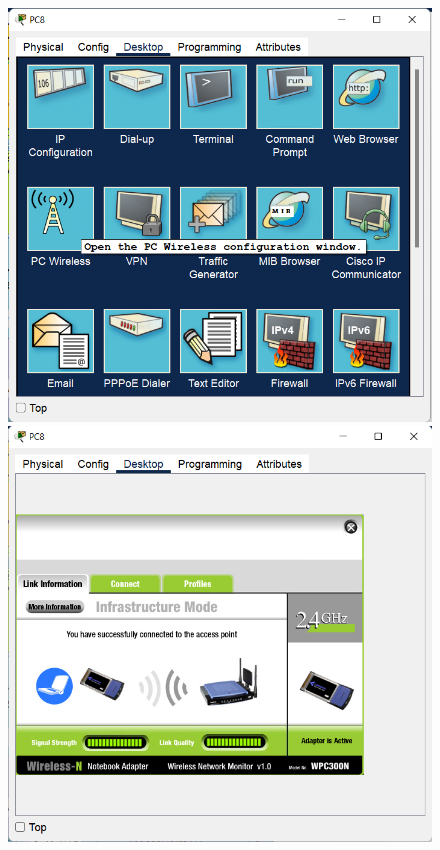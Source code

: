 \begin{enumerate}
\begin{enumerate}
\begin{figure}[H]
\begin{center}
\includegraphics[scale=.5]{../figures/p2/ap5}
\includegraphics[scale=.5]{../figures/p2/ap6}

\end{center}
\end{figure}
\end{enumerate}
\end{enumerate}
